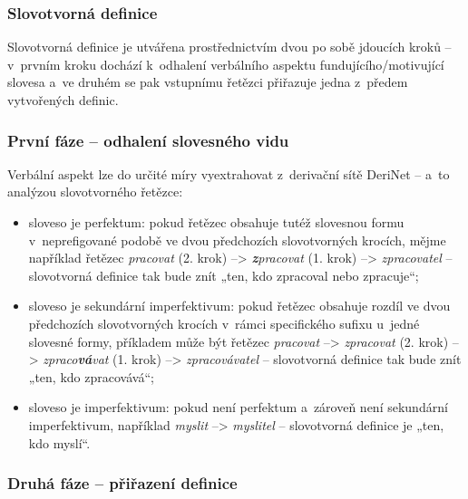 \hypertarget{slovotvornuxe1-definice}{%
\subsubsection{Slovotvorná definice}\label{slovotvornuxe1-definice}}

Slovotvorná definice je utvářena prostřednictvím dvou po sobě jdoucích
kroků -- v~prvním kroku dochází k~odhalení verbálního aspektu
fundujícího/motivující slovesa a~ve druhém se pak vstupnímu řetězci
přiřazuje jedna z~předem vytvořených definic.

\hypertarget{prvni-faze}{%
\subsubsection*{První fáze -- odhalení slovesného vidu}\label{prvni-faze}}

Verbální aspekt lze do určité míry vyextrahovat z~derivační sítě DeriNet
-- a~to analýzou slovotvorného řetězce:

\begin{itemize}
\tightlist
\item
  sloveso je perfektum: pokud řetězec obsahuje tutéž slovesnou formu
v~neprefigované podobě ve dvou předchozích slovotvorných krocích, mějme
  například řetězec \emph{pracovat} (2. krok) --\textgreater{}
  \emph{\textbf{z}pracovat} (1. krok) --\textgreater{}
  \emph{zpracovatel} -- slovotvorná definice tak bude znít „ten, kdo
  zpracoval nebo zpracuje``;
\item
  sloveso je sekundární imperfektivum: pokud řetězec obsahuje rozdíl ve
  dvou předchozích slovotvorných krocích v~rámci specifického sufixu
u~jedné slovesné formy, příkladem může být řetězec \emph{pracovat}
  --\textgreater{} \emph{zpracovat} (2. krok) --\textgreater{}
  \emph{zpraco\textbf{vá}vat} (1. krok) --\textgreater{}
  \emph{zpracovávatel} -- slovotvorná definice tak bude znít „ten, kdo
  zpracovává``;
\item
  sloveso je imperfektivum: pokud není perfektum a~zároveň není
  sekundární imperfektivum, například \emph{myslit} --\textgreater{}
  \emph{myslitel} -- slovotvorná definice je „ten, kdo myslí``.
 ~\parencite{adri}
\end{itemize}

\hypertarget{druha-faze}{%
\subsubsection*{Druhá fáze -- přiřazení definice}\label{druha-faze}}

